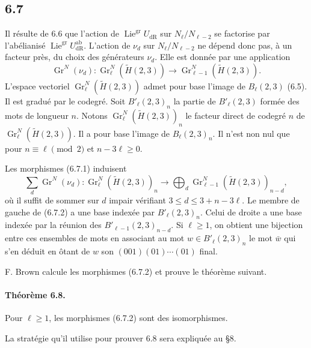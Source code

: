 \documentclass[10pt]{article}
\newcommand{\dR}{\mathrm{dR}}
\begin{document}
\subsection*{6.7}
Il résulte de 6.6 que l'action de $\operatorname{Lie}^{\mathrm{gr}}U_{\dR}$ sur $N_{\ell}/N_{\ell-2}$ se factorise par l'abélianisé $\operatorname{Lie}^{\mathrm{gr}}U^{\mathrm{ab}}_{\dR}$. L'action de $\nu_d$ sur $N_{\ell}/N_{\ell-2}$ ne dépend donc pas, à un facteur près, du choix des générateurs $\nu_d$. Elle est donnée par une application
\begin{equation}
\operatorname{Gr}^{N}(\nu_d):\operatorname{Gr}^{N}_{\ell}(\widetilde H(2,3))\longrightarrow \operatorname{Gr}^{N}_{\ell-1}(\widetilde H(2,3)).
\tag{6.7.1}
\end{equation}
L'espace vectoriel $\operatorname{Gr}^{N}_{\ell}(\widetilde H(2,3))$ admet pour base l'image de $B_{\ell}(2,3)$ (6.5). Il est gradué par le codegré. Soit $B'_{\ell}(2,3)_n$ la partie de $B'_{\ell}(2,3)$ formée des mots de longueur $n$. Notons $\operatorname{Gr}^{N}_{\ell}(\widetilde H(2,3))_n$ le facteur direct de codegré $n$ de $\operatorname{Gr}^{N}_{\ell}(\widetilde H(2,3))$. Il a pour base l'image de $B_{\ell}(2,3)_n$. Il n'est non nul que pour $n\equiv\ell\pmod2$ et $n-3\ell\geq0$.

Les morphismes (6.7.1) induisent
\begin{equation}
\sum_d\operatorname{Gr}^{N}(\nu_d):\operatorname{Gr}^{N}_{\ell}(\widetilde H(2,3))_n\longrightarrow
\bigoplus_d\operatorname{Gr}^{N}_{\ell-1}(\widetilde H(2,3))_{n-d},
\tag{6.7.2}
\end{equation}
où il suffit de sommer sur $d$ impair vérifiant $3\leq d\leq3+n-3\ell$. Le membre de gauche de (6.7.2) a une base indexée par $B'_{\ell}(2,3)_n$. Celui de droite a une base indexée par la réunion des $B'_{\ell-1}(2,3)_{n-d}$. Si $\ell\geq1$, on obtient une bijection entre ces ensembles de mots en associant au mot $w\in B'_{\ell}(2,3)_n$ le mot $\bar w$ qui s'en déduit en ôtant de $w$ son $(001)(01)\cdots(01)$ final.

F. Brown calcule les morphismes (6.7.2) et prouve le théorème suivant.

\paragraph{Théorème 6.8.}
Pour $\ell\geq1$, les morphismes (6.7.2) sont des isomorphismes.

La stratégie qu'il utilise pour prouver 6.8 sera expliquée au §8.
\end{document}
